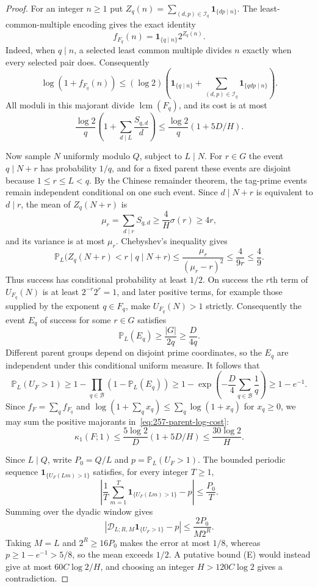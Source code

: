 \documentclass[11pt]{article}
\theoremstyle{plain}
\theoremstyle{definition}
\theoremstyle{remark}
\begin{document}
\begin{proof}
For an integer $n\ge1$ put
$Z_q(n)=\sum_{(d,p)\in\mathcal I_q}\mathbf1_{\{dp\mid n\}}$.
The least-common-multiple encoding gives the exact identity
\[
 f_{F_q}(n)=\mathbf1_{\{q\mid n\}}2^{Z_q(n)}.
\]
Indeed, when $q\mid n$, a selected least common multiple divides $n$
exactly when every selected pair does.  Consequently
\[
 \log(1+f_{F_q}(n))
 \le(\log2)\left(\mathbf1_{\{q\mid n\}}
          +\sum_{(d,p)\in\mathcal I_q}\mathbf1_{\{qdp\mid n\}}\right).
\]
All moduli in this majorant divide $\operatorname{lcm}(F_q)$,
and its cost is at most
\begin{equation}
 \frac{\log2}{q}\left(1+\sum_{d\mid L}\frac{S_{q,d}}d\right)
 \le\frac{\log2}{q}(1+5D/H).
 \label{eq:257-parent-log-cost}
\end{equation}

Now sample $N$ uniformly modulo $Q$, subject to $L\mid N$.
For $r\in G$ the event $q\mid N+r$ has probability $1/q$, and
for a fixed parent these events are disjoint because $1\le r\le L<q$.
By the Chinese remainder theorem, the tag-prime events remain independent
conditional on one such event.  Since $d\mid N+r$ is equivalent to
$d\mid r$, the mean of $Z_q(N+r)$ is
\[
 \mu_r=\sum_{d\mid r}S_{q,d}
 \ge\frac4H\sigma(r)\ge4r,
\]
and its variance is at most $\mu_r$.
Chebyshev's inequality gives
\[
 \mathbb P_L\bigl(Z_q(N+r)<r\mid q\mid N+r\bigr)
 \le\frac{\mu_r}{(\mu_r-r)^2}
 \le\frac4{9r}\le\frac49.
\]
Thus success has conditional probability at least $1/2$.
On success the $r$th term of $U_{F_q}(N)$ is at least
$2^{-r}2^r=1$, and later positive terms, for example those supplied by the
exponent $q\in F_q$, make $U_{F_q}(N)>1$ strictly.
Consequently the event $E_q$ of success for some $r\in G$ satisfies
\[
 \mathbb P_L(E_q)\ge\frac{|G|}{2q}\ge\frac{D}{4q}.
\]
Different parent groups depend on disjoint prime coordinates, so the
$E_q$ are independent under this conditional uniform measure.  It follows
that
\[
 \mathbb P_L(U_F>1)\ge
 1-\prod_{q\in\mathcal B}(1-\mathbb P_L(E_q))
 \ge1-\exp\left(-\frac D4\sum_{q\in\mathcal B}\frac1q\right)
 \ge1-e^{-1}.
\]
Since $f_F=\sum_qf_{F_q}$ and
$\log(1+\sum_qx_q)\le\sum_q\log(1+x_q)$ for $x_q\ge0$,
we may sum the positive majorants in~\eqref{eq:257-parent-log-cost}:
\[
 \kappa_1(F;1)\le\frac{5\log2}{D}(1+5D/H)
 \le\frac{30\log2}{H}.
\]

Since $L\mid Q$, write $P_0=Q/L$ and $p=\mathbb P_L(U_F>1)$.  The bounded periodic
sequence $\mathbf1_{\{U_F(Lm)>1\}}$ satisfies, for every integer $T\ge1$,
\[
 \left|\frac1T\sum_{m=1}^{T}\mathbf1_{\{U_F(Lm)>1\}}-p\right|
 \le\frac{P_0}{T}.
\]
Summing over the dyadic window gives
\[
 \left|\mathscr D_{L;R,M}\mathbf1_{\{U_F>1\}}-p\right|
 \le\frac{2P_0}{M2^R}.
\]
Taking $M=L$ and $2^R\ge16P_0$ makes the error at most $1/8$, whereas
$p\ge1-e^{-1}>5/8$, so the mean exceeds $1/2$.
A putative bound (E) would instead give at most $60C\log2/H$, and
choosing an integer $H>120C\log2$ gives a contradiction.
\end{proof}
\end{document}
